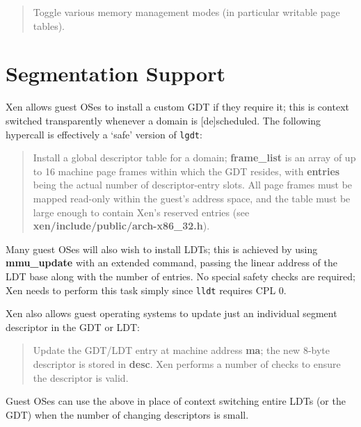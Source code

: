 \documentclass[11pt,twoside,final,openright,a4paper]{report}
\newcommand{\hypercall}[1]{\vspace{2mm}{\sf #1}}
\begin{document}
\begin{quote} 
\hypercall{vm\_assist(unsigned int cmd, unsigned int type)}

Toggle various memory management modes (in particular writable page
tables).

\end{quote} 

\section{Segmentation Support}

Xen allows guest OSes to install a custom GDT if they require it; 
this is context switched transparently whenever a domain is 
[de]scheduled.  The following hypercall is effectively a 
`safe' version of {\tt lgdt}: 

\begin{quote}
\hypercall{set\_gdt(unsigned long *frame\_list, int entries)} 

Install a global descriptor table for a domain; {\bf frame\_list} is
an array of up to 16 machine page frames within which the GDT resides,
with {\bf entries} being the actual number of descriptor-entry
slots. All page frames must be mapped read-only within the guest's
address space, and the table must be large enough to contain Xen's
reserved entries (see {\bf xen/include/public/arch-x86\_32.h}).

\end{quote}

Many guest OSes will also wish to install LDTs; this is achieved by
using {\bf mmu\_update} with an extended command, passing the
linear address of the LDT base along with the number of entries. No
special safety checks are required; Xen needs to perform this task
simply since {\tt lldt} requires CPL 0.


Xen also allows guest operating systems to update just an 
individual segment descriptor in the GDT or LDT:  

\begin{quote}
\hypercall{update\_descriptor(uint64\_t ma, uint64\_t desc)}

Update the GDT/LDT entry at machine address {\bf ma}; the new
8-byte descriptor is stored in {\bf desc}.
Xen performs a number of checks to ensure the descriptor is 
valid. 

\end{quote}

Guest OSes can use the above in place of context switching entire 
LDTs (or the GDT) when the number of changing descriptors is small. 
\end{document}

